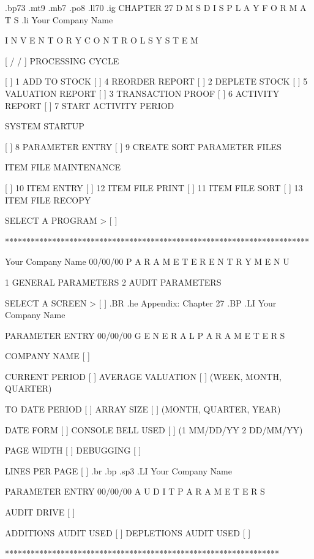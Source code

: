 .bp73
.mt9
.mb7
.po8
.ll70
.ig
CHAPTER 27
D M S	  D I S P L A Y    F O R M A T S
.li
		     Your Company Name

	 I N V E N T O R Y   C O N T R O L   S Y S T E M

[  /  /  ]	      PROCESSING CYCLE

[ ]  1 ADD TO STOCK		     [ ]  4 REORDER REPORT
[ ]  2 DEPLETE STOCK		     [ ]  5 VALUATION REPORT
[ ]  3 TRANSACTION PROOF	     [ ]  6 ACTIVITY REPORT
				     [ ]  7 START ACTIVITY PERIOD

		       SYSTEM STARTUP

[ ]  8 PARAMETER ENTRY		     [ ]  9 CREATE SORT PARAMETER FILES

		   ITEM FILE MAINTENANCE

[ ] 10 ITEM ENTRY		     [ ] 12 ITEM FILE PRINT
[ ] 11 ITEM FILE SORT		     [ ] 13 ITEM FILE RECOPY

		   SELECT A PROGRAM > [  ]

***********************************************************************

		      Your Company Name
      00/00/00	  P A R A M E T E R   E N T R Y   M E N U

		  1  GENERAL PARAMETERS
		  2  AUDIT PARAMETERS

		  SELECT A SCREEN > [  ]
.BR
.he Appendix: Chapter 27
.BP
.LI
		     Your Company Name

		     PARAMETER ENTRY
    00/00/00	G E N E R A L	 P A R A M E T E R S

COMPANY NAME [						     ]

CURRENT PERIOD [       ]	       AVERAGE VALUATION  [   ]
     (WEEK, MONTH, QUARTER)

TO DATE PERIOD [       ]	       ARRAY SIZE	[     ]
     (MONTH, QUARTER, YEAR)

DATE FORM		  [ ]	       CONSOLE BELL USED   [  ]
     (1 MM/DD/YY  2 DD/MM/YY)

PAGE WIDTH	[   ]		       DEBUGGING	   [  ]

LINES PER PAGE	[   ]
.br
.bp
.sp3
.LI
			 Your Company Name

			  PARAMETER ENTRY
	 00/00/00      A U D I T   P A R A M E T E R S

		       AUDIT DRIVE  [ ]

		       ADDITIONS AUDIT USED [ ]
		       DEPLETIONS AUDIT USED [ ]



****************************************************************


